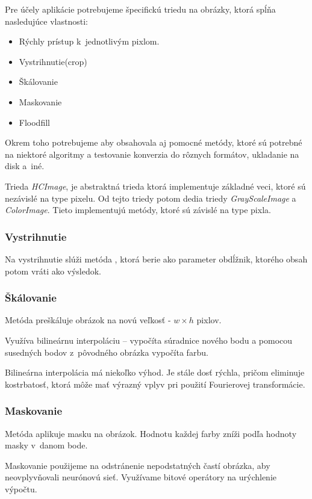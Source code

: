 Pre účely aplikácie potrebujeme špecifickú triedu na obrázky, ktorá spĺňa nasledujúce vlastnosti:
\begin{itemize}
\item Rýchly prístup k~jednotlivým pixlom.
\item Vystrihnutie(crop)
\item Škálovanie
\item Maskovanie
\item Floodfill
\end{itemize}
Okrem toho potrebujeme aby obsahovala aj pomocné metódy, ktoré sú potrebné na niektoré algoritmy a testovanie konverzia do rôznych formátov, ukladanie na disk a~iné.

Trieda \textit{HCImage}, je abstraktná trieda ktorá implementuje základné veci, ktoré sú nezávislé na type pixelu. Od tejto triedy potom dedia triedy \textit{GrayScaleImage} a \textit{ColorImage}. Tieto implementujú metódy, ktoré sú závislé na type pixla. 

\subsubsection{Vystrihnutie}
Na vystrihnutie slúži metóda , ktorá berie ako parameter obdĺžnik, ktorého obsah potom vráti ako výsledok. 

\subsubsection{Škálovanie}
Metóda  preškáluje obrázok na novú veľkosť - $w\times h$ pixlov.

Využíva bilineárnu interpoláciu -- vypočíta súradnice nového bodu a pomocou susedných bodov z~pôvodného obrázka vypočíta farbu.

Bilineárna interpolácia má niekoľko výhod. Je stále dosť rýchla, pričom eliminuje kostrbatosť, ktorá môže mať výrazný vplyv pri použití Fourierovej transformácie.

\subsubsection{Maskovanie}

Metóda  aplikuje masku na obrázok. Hodnotu každej farby zníži podľa hodnoty masky v~danom bode.

Maskovanie použijeme na odstránenie nepodstatných častí obrázka, aby neovplyvňovali neurónovú sieť. Využívame bitové operátory na urýchlenie výpočtu. %

